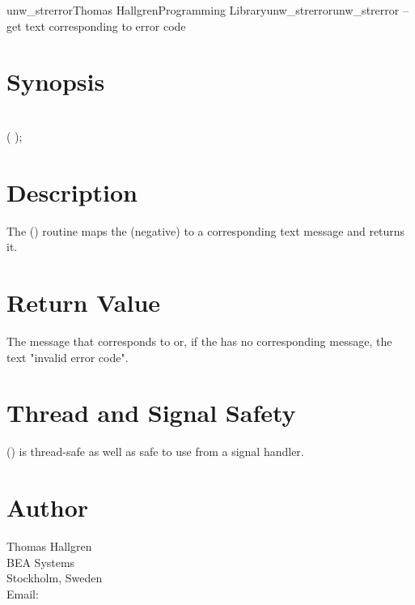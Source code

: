 \documentclass{article}
\begin{document}
\begin{Name}{3}{unw\_strerror}{Thomas Hallgren}{Programming Library}{unw\_strerror}unw\_strerror -- get text corresponding to error code
\end{Name}

\section{Synopsis}

\\

 ( );\\

\section{Description}

The () routine maps the (negative) 
to a corresponding text message and returns it.

\section{Return Value}

The message that corresponds to  or, if the
 has no corresponding message, the text "invalid error
code".

\section{Thread and Signal Safety}

() is thread-safe as well as safe to use
from a signal handler.

\section{Author}

\noindent
Thomas Hallgren\\
BEA Systems\\
Stockholm, Sweden\\
Email: \\
\LatexManEnd
\end{document}
